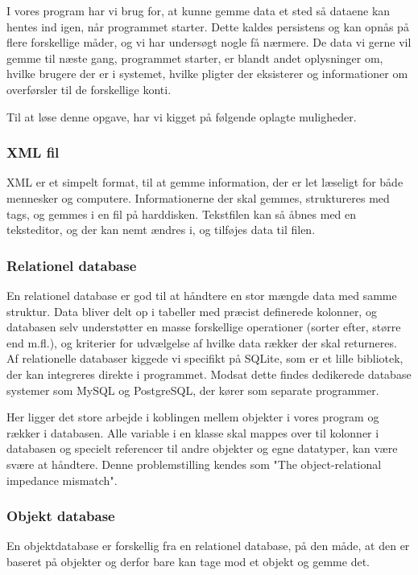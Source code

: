 I vores program har vi brug for, at kunne gemme data et sted så dataene kan hentes ind igen, når programmet starter. Dette kaldes persistens og kan opnås på flere forskellige måder, og vi har undersøgt nogle få nærmere.
De data vi gerne vil gemme til næste gang, programmet starter, er blandt andet oplysninger om, hvilke brugere der er i systemet, hvilke pligter der eksisterer og informationer om overførsler til de forskellige konti. 

Til at løse denne opgave, har vi kigget på følgende oplagte muligheder.

\subsubsection{XML fil}
XML er et simpelt format, til at gemme information, der er let læseligt for både mennesker og computere. Informationerne der skal gemmes, struktureres med tags, og gemmes i en fil på harddisken\cite{xmlspecs}. Tekstfilen kan så åbnes med en teksteditor, og der kan nemt ændres i, og tilføjes data til filen.


\subsubsection{Relationel database}
En relationel database er god til at håndtere en stor mængde data med samme struktur. Data bliver delt op i tabeller med præcist definerede kolonner, og databasen selv understøtter en masse forskellige operationer (sorter efter, større end m.fl.), og kriterier for udvælgelse af hvilke data rækker der skal returneres. Af relationelle databaser kiggede vi specifikt på SQLite, som er et lille bibliotek, der kan integreres direkte i programmet. Modsat dette findes dedikerede database systemer som MySQL og PostgreSQL, der kører som separate programmer.

Her ligger det store arbejde i koblingen mellem objekter i vores program og rækker i databasen. Alle variable i en klasse skal mappes over til kolonner i databasen og specielt referencer til andre objekter og egne datatyper, kan være svære at håndtere. Denne problemstilling kendes som "The object-relational impedance mismatch"\cite{ORIM}.

\subsubsection{Objekt database}
En objektdatabase er forskellig fra en relationel database, på den måde, at den er baseret på objekter og derfor bare kan tage mod et objekt og gemme det.

